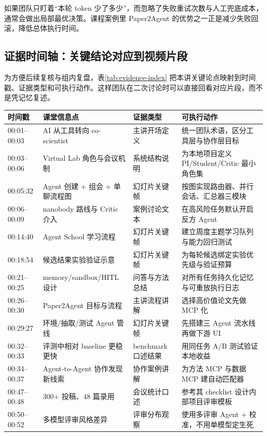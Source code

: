 如果团队只盯着``本轮 token 少了多少''，而忽略了失败重试次数与人工兜底成本，通常会做出局部最优决策。课程案例里 Paper2Agent 的优势之一正是减少失败回滚，降低总体执行时间。

\subsection{证据时间轴：关键结论对应到视频片段}

为方便后续复核与组内复盘，表\ref{tab:evidence-index} 把本讲关键论点映射到时间戳、证据类型和可执行动作。这样团队在二次讨论时可以直接回看对应片段，而不是凭记忆复述。

\begin{table}[H]
\centering
\small
\begin{tabular}{p{}p{}p{}p{}}
\toprule
时间戳 & 课堂信息点 & 证据类型 & 可执行动作 \\
\midrule
00:01--00:03 & AI 从工具转向 co-scientist & 主讲开场定义 & 统一团队术语，区分工具层与协作层目标 \\
00:03--00:06 & Virtual Lab 角色与会议机制 & 系统结构说明 & 为本地项目定义 PI/Student/Critic 最小角色集 \\
00:05:32 & Agent 创建 + 组会 + 单聊流程图 & 幻灯片关键帧 & 按图实现路由器、并行会话、汇总器三模块 \\
00:06--00:09 & nanobody 路线与 Critic 介入 & 案例讨论文本 & 在高风险任务默认开启反方 Agent \\
00:14:40 & Agent School 学习流程 & 幻灯片关键帧 & 建立周度主题学习队列与能力回归测试 \\
00:18:54 & 候选结果实验验证示意 & 幻灯片关键帧 & 为每轮候选绑定实验优先级与验证预算 \\
00:21--00:25 & memory/sandbox/HITL 设计 & 问答与方法总结 & 对所有任务持久化记忆与可重放执行日志 \\
00:26--00:30 & Paper2Agent 目标与流程 & 主讲流程讲解 & 选择高价值论文先做 MCP 化 \\
00:29:27 & 环境/抽取/测试 Agent 管线 & 幻灯片关键帧 & 先搭建三 Agent 流水线再做下游 UI \\
00:32--00:33 & 评测中相对 baseline 更稳更快 & benchmark 口述结果 & 用同任务 A/B 测试验证本地收益 \\
00:34--00:37 & Agent-to-Agent 协作发现新线索 & 协作案例讲解 & 为方法 MCP 与数据 MCP 建自动匹配器 \\
00:47--00:48 & 300+ 投稿、48 篇录用 & 会议统计口述 & 参考其 checklist 设计内部项目评审模板 \\
00:50--00:52 & 多模型评审风格差异 & 评审分布观察 & 使用多评审 Agent + 校准，不用单模型定生死 \\

\end{tabular}
\end{table}
